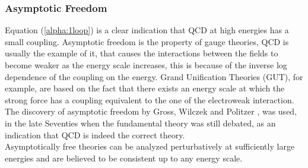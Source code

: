 \subsubsection{Asymptotic Freedom}
Equation (\ref{alpha:1loop}) is a clear indication that QCD at high energies has a small coupling. Asymptotic freedom is the property of gauge theories, QCD is usually the example of it, that causes the interactions between the fields to become weaker as the energy scale increases, this is because of the inverse log dependence of the coupling on the energy. Grand Unification Theories (GUT), for example, are based on the fact that there exists an energy scale at which the strong force has a coupling equivalent to the one of the electroweak interaction.  \\
The discovery of asymptotic freedom by Gross, Wilczek and Politzer \cite{Gross-Wilczek, Politzer},  was used, in the late Seventies when the fundamental theory was still debated, as an indication that QCD is indeed the correct theory.\\
Asymptotically free theories can be analyzed perturbatively at sufficiently large energies and are believed to be consistent up to any energy scale.


